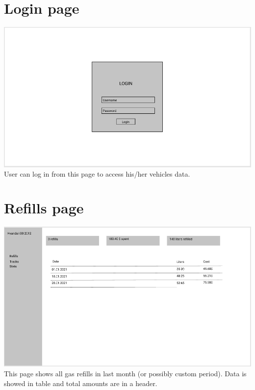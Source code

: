 \section{Login page}\label{sec:login-page}
\includegraphics[width=\textwidth]{figures/login_page}
User can log in from this page to access his/her vehicles data.

\section{Refills page}\label{sec:refills-page}
\includegraphics[width=\textwidth]{figures/refills_page}
This page shows all gas refills in last month (or possibly custom period).
Data is showed in table and total amounts are in a header.

